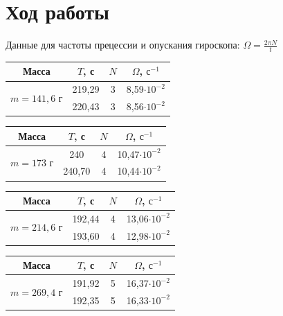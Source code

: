 \documentclass[a4paper, 12pt]{article}
\begin{document}
	\section{Ход работы}
	Данные для частоты прецессии и опускания гироскопа: $\Omega=\frac{2\pi N}{t}$

    \begin{center}
		\begin{tabular}{|c|c|c|c|}
			\hline
			Масса & $T$, с& $N$ & $\Omega$, $\text{с}^{-1}$  \\
			\hline
			\multirow{2}{*}{$m = 141,6$ г}&219,29&3&8,59$\cdot 10^{-2}$ \\
			\cline{2-4}
			&220,43 & 3 &8,56$\cdot 10^{-2}$  \\
			\hline
		\end{tabular}
		\quad
		\begin{tabular}{|c|c|c|c|}
			\hline
			Масса & $T$, с& $N$ & $\Omega$, $\text{с}^{-1}$ \\
			\hline
			\multirow{2}{*}{$m = 173$ г}&240&4&10,47$\cdot 10^{-2}$ \\
			\cline{2-4}
			&240,70 & 4 &10,44$\cdot 10^{-2}$  \\
			\hline
		\end{tabular}
	\end{center}
 
    \begin{center}
		\begin{tabular}{|c|c|c|c|}
			\hline
			Масса & $T$, с& $N$ &$\Omega$, $\text{с}^{-1}$ \\
			\hline
			\multirow{2}{*}{$m = 214,6$ г}&192,44&4& 13,06$\cdot 10^{-2}$ \\
			\cline{2-4}
			&193,60 & 4 &12,98$\cdot 10^{-2}$  \\
			\hline
		\end{tabular}
		\quad
		\begin{tabular}{|c|c|c|c|}
			\hline
			Масса & $T$, с& $N$ &$\Omega$, $\text{с}^{-1}$ \\
			\hline
			\multirow{2}{*}{$m = 269,4$ г}&191,92&5&16,37$\cdot 10^{-2}$ \\
			\cline{2-4}
			&192,35 & 5 &16,33$\cdot 10^{-2}$  \\
			\hline
		\end{tabular}
	\end{center}
	
\end{document}
